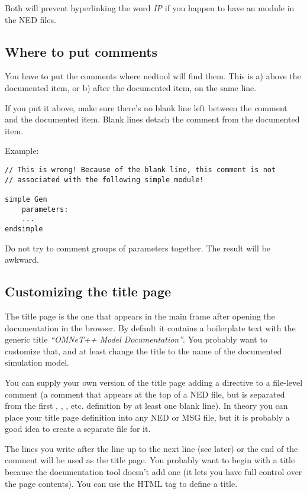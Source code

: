 Both will prevent hyperlinking the word \textit{IP} if you happen to have
an  module in the NED files.



\subsection{Where to put comments}

You have to put the comments where nedtool will find them.
This is a) above the documented item, or b) after the
documented item, on the same line.

If you put it above, make sure there's no blank line left
between the comment and the documented item. Blank lines
detach the comment from the documented item.

Example:
\begin{verbatim}
// This is wrong! Because of the blank line, this comment is not
// associated with the following simple module!

simple Gen
    parameters:
    ...
endsimple
\end{verbatim}

Do not try to comment groups of parameters together. The result
will be awkward.


\subsection{Customizing the title page}

The title page is the one that appears in the main frame after
opening the documentation in the browser. By default it contains
a boilerplate text with the generic title \textit{``OMNeT++ Model Documentation''}.
You probably want to customize that, and at least change the title
to the name of the documented simulation model.

You can supply your own version of the title page adding a 
directive to a file-level comment (a comment that appears at the top of
a NED file, but is separated from the first , ,
, etc. definition by at least one blank line).
In theory you can place your title page definition into
any NED or MSG file, but it is probably a good idea to create
a separate  file for it.

The lines you write after the  line up to the next
 line (see later) or the end of the comment will be used
as the title page.
You probably want to begin with a title because the documentation
tool doesn't add one (it lets you have full control over the
page contents). You can use the  HTML tag
to define a title.

